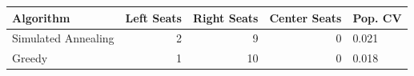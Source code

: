 \begin{tabular}{lrrrl}
\toprule
Algorithm & Left Seats & Right Seats & Center Seats & Pop. CV \\
\midrule
Simulated Annealing & 2 & 9 & 0 & 0.021 \\
Greedy & 1 & 10 & 0 & 0.018 \\
\bottomrule
\end{tabular}
